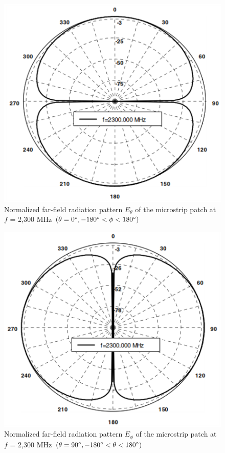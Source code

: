 \documentclass[11pt,a4paper,hidelinks]{article}
\begin{document}
      \begin{figure}
        \includegraphics{rad3.png}
        \centering
        \caption{Normalized far-field radiation pattern $E_\theta$ of the microstrip patch at $f$ = 2,300 MHz $(\theta = 0\degree, -180\degree < \phi < 180\degree)$ \cite{NoK:05}}
      \end{figure}

      \begin{figure}
        \includegraphics{rad4.png}
        \centering
        \caption{Normalized far-field radiation pattern $E_\phi$ of the microstrip patch at $f$ = 2,300 MHz $(\theta = 90\degree, -180\degree < \theta < 180\degree)$ \cite{NoK:05}}
      \end{figure}
\end{document}
